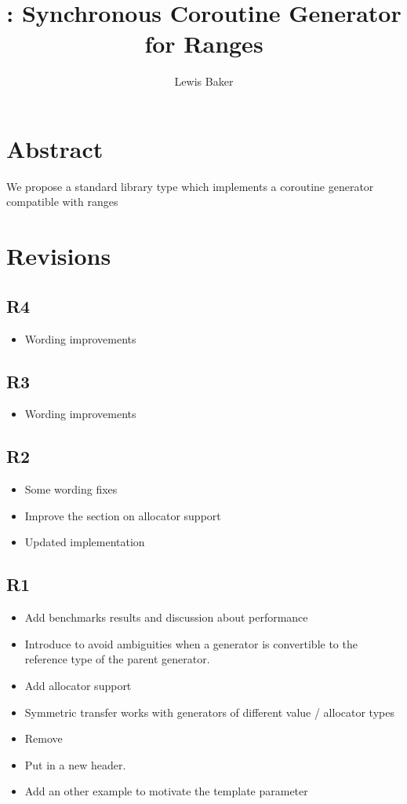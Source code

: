 \documentclass{wg21}
\title{\tcode{std::generator}: Synchronous Coroutine Generator for Ranges}
\author{Lewis Baker}{lewissbaker@gmail.com}
\begin{document}
\maketitle


\section{Abstract}

We propose a standard library type  which implements a coroutine generator compatible with ranges


\section{Revisions}

\subsection{R4}
\begin{itemize}
\item Wording improvements
\end{itemize}

\subsection{R3}
\begin{itemize}
\item Wording improvements
\end{itemize}

\subsection{R2}
\begin{itemize}
\item Some wording fixes
\item Improve the section on allocator support
\item Updated implementation
\end{itemize}

\subsection{R1}
\begin{itemize}
\item Add benchmarks results and discussion about performance
\item Introduce  to avoid ambiguities when a generator is convertible to the reference type of the parent generator.
\item Add allocator support
\item Symmetric transfer works with generators of different value / allocator types
\item Remove 
\item Put  in a new  header.
\item Add an other example to motivate the  template parameter
\end{itemize}
\end{document}
